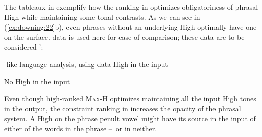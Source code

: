\documentclass[output=paper,newtxmath,modfonts,nonflat,hidelinks]{langsci/langscibook}
\begin{document}
The tableaux in  exemplify how the ranking in  optimizes obligatoriness of phrasal High  while maintaining some tonal contrasts. As we can see in (\ref{ex:downing:22}b), even phrases without an underlying High  optimally have one on the surface.  data is used here for ease of comparison; these data are to be considered ’:


\ea\label{ex:downing:22}-like language analysis, using  data
\ea\label{ex:downing:22a} High  in the input

\sn
\ex\label{ex:downing:22b}No High  in the input 

\z
\z
Even though high-ranked \textsc{Max-H} optimizes maintaining all the input High tones in the output, the constraint ranking in  increases the opacity of the phrasal  system. A High  on the phrase penult vowel might have its source in the input of either of the words in the phrase –~or in neither.
\end{document}

